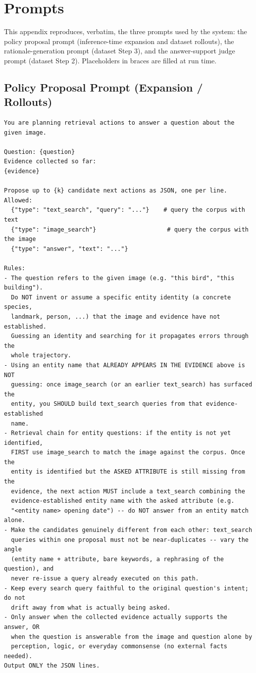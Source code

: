 \documentclass[letterpaper,twocolumn,10pt]{article}
\begin{document}
\section{Prompts}
\label{app:prompts}

This appendix reproduces, verbatim, the three prompts used by the system:
the policy proposal prompt (inference-time expansion and dataset rollouts),
the rationale-generation prompt (dataset Step 3), and the answer-support
judge prompt (dataset Step 2). Placeholders in braces are filled at run
time.

\subsection{Policy Proposal Prompt (Expansion / Rollouts)}
\begin{lstlisting}[style=prompt]
You are planning retrieval actions to answer a question about the given image.

Question: {question}
Evidence collected so far:
{evidence}

Propose up to {k} candidate next actions as JSON, one per line. Allowed:
  {"type": "text_search", "query": "..."}    # query the corpus with text
  {"type": "image_search"}                    # query the corpus with the image
  {"type": "answer", "text": "..."}

Rules:
- The question refers to the given image (e.g. "this bird", "this building").
  Do NOT invent or assume a specific entity identity (a concrete species,
  landmark, person, ...) that the image and evidence have not established.
  Guessing an identity and searching for it propagates errors through the
  whole trajectory.
- Using an entity name that ALREADY APPEARS IN THE EVIDENCE above is NOT
  guessing: once image_search (or an earlier text_search) has surfaced the
  entity, you SHOULD build text_search queries from that evidence-established
  name.
- Retrieval chain for entity questions: if the entity is not yet identified,
  FIRST use image_search to match the image against the corpus. Once the
  entity is identified but the ASKED ATTRIBUTE is still missing from the
  evidence, the next action MUST include a text_search combining the
  evidence-established entity name with the asked attribute (e.g.
  "<entity name> opening date") -- do NOT answer from an entity match alone.
- Make the candidates genuinely different from each other: text_search
  queries within one proposal must not be near-duplicates -- vary the angle
  (entity name + attribute, bare keywords, a rephrasing of the question), and
  never re-issue a query already executed on this path.
- Keep every search query faithful to the original question's intent; do not
  drift away from what is actually being asked.
- Only answer when the collected evidence actually supports the answer, OR
  when the question is answerable from the image and question alone by
  perception, logic, or everyday commonsense (no external facts needed).
Output ONLY the JSON lines.
\end{lstlisting}
\end{document}
